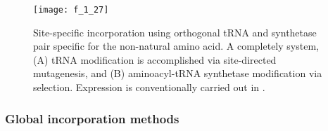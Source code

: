 \begin{refsection}
\begin{figure}[h!] \centering \texttt{[image: f\_1\_27]}
    \caption[Site-specific incorporation using orthogonal tRNA and synthetase
        pair specific for the non-natural amino acid. A completely  system, (A) tRNA modification is accomplished via site-directed
        mutagenesis, and (B) aminoacyl-tRNA synthetase modification via
         selection. Expression is conventionally carried out in
        .]{Site-specific incorporation using orthogonal tRNA and synthetase
        pair specific for the non-natural amino acid. A completely  system, (A) tRNA modification is accomplished via site-directed
        mutagenesis, and (B) aminoacyl-tRNA synthetase modification via
         selection. Expression is conventionally carried out in
        .\cite{Yoder2002}}
    \label{fig:orthogonal_incorporation} \end{figure}




\subsubsection{Global incorporation methods} 


\end{refsection}
